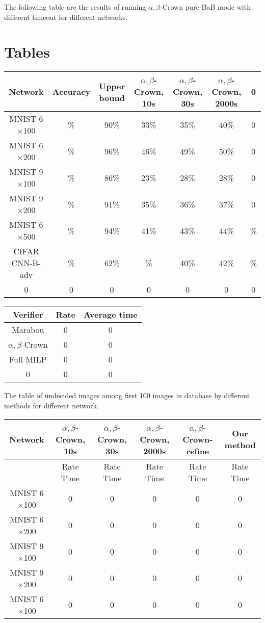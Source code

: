 

The following table are the results of running $\alpha,\beta$-Crown pure BaB mode with different timeout for different networks.

\section*{Tables}

\begin{tabular}{|c|c|c|c|c|c|c|}
	\hline
	Network & Accuracy & Upper bound & $\alpha,\beta$-Crown, 10s & $\alpha,\beta$-Crown, 30s & $\alpha,\beta$-Crown, 2000s &  0 \\ \hline
	MNIST 6$\times$100 & \% & 90\% & 33\% & 35\% & 40\% &  0 \\ \hline
	MNIST 6$\times$200 & \% & 96\% & 46\% & 49\% & 50\% &  0 \\ \hline
	MNIST 9$\times$100 & \% & 86\% & 23\% & 28\% & 28\% &  0 \\ \hline
	MNIST 9$\times$200 & \% & 91\% & 35\% & 36\% & 37\% &  0 \\ \hline
	MNIST 6$\times$500 & \% & 94\% & 41\% & 43\% & 44\% &  \% \\ \hline
	CIFAR CNN-B-adv & \% & 62\% & \% & 40\% & 42\% &  \% \\ \hline
	0 & 0 & 0 & 0 & 0 & 0 & 0  \\ \hline
\end{tabular}

\vspace*{4ex}
\begin{tabular}{|c|c|c|}
	\hline
	Verifier & Rate & Average time \\ \hline
	Marabou & 0 & 0 \\ \hline
	$\alpha,\beta$-Crown & 0 & 0 \\ \hline
	Full MILP & 0 & 0 \\ \hline
	0 & 0 & 0 \\ \hline
\end{tabular}



\vspace*{4ex}

The table of undecided images among first 100 images in database by different methods for different network.

\begin{tabular}{|c|c|c|c|c|c|}
	\hline
	Network & $\alpha,\beta$-Crown, 10s & $\alpha,\beta$-Crown, 30s & $\alpha,\beta$-Crown, 2000s & $\alpha,\beta$-Crown-refine & Our method \\ \hline
	& Rate \hfill Time & Rate \hfill Time & Rate \hfill Time & Rate \hfill Time & Rate \hfill Time\\ \hline
	MNIST 6$\times$100 & 0 & 0 & 0 & 0 & 0 \\ \hline
	MNIST 6$\times$200 & 0 & 0 & 0 & 0 & 0 \\ \hline
	MNIST 9$\times$100 & 0 & 0 & 0 & 0 & 0 \\ \hline
	MNIST 9$\times$200 & 0 & 0 & 0 & 0 & 0 \\ \hline
	MNIST 6$\times$100 & 0 & 0 & 0 & 0 & 0 \\ \hline
\end{tabular}